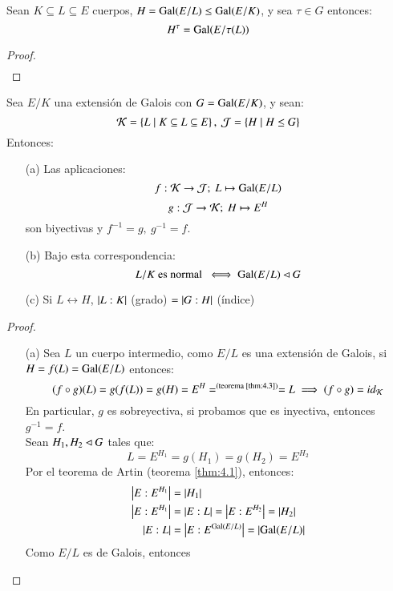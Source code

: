 \begin{lm}\label{lm:4.5} %
    Sean $K \subseteq L \subseteq E$ cuerpos, $H = \mathrm{Gal}(E/L) \leq \mathrm{Gal}(E/K)$, y sea $\tau \in G$ entonces:
    $$
        H^\tau = \mathrm{Gal}(E/\tau(L))
    $$
\end{lm}
\begin{proof}$ $
    \begin{align*}
    \end{align*}
\end{proof}


\begin{thm}\label{thm:fund-gal}\label{thm:4.6}
    Sea $E/K$ una extensión de Galois con $G = \mathrm{Gal}(E/K)$, y sean:
    $$
        \mathcal{K} = \left\{L \mid K \subseteq L \subseteq E\right\},\ \mathcal{J} = \left\{H \mid H \leq G\right\}
    $$
    Entonces:
    \begin{itemize}
        \item[(a)] Las aplicaciones:
        $$ f: \mathcal{K} \to \mathcal{J};\ L \mapsto \mathrm{Gal}(E/L)$$
        $$ g: \mtc{J} \to \mtc{K};\ H \mapsto E^H $$
        son biyectivas y $f^{-1} = g,\ g^{-1} = f$.
        \item[(b)] Bajo esta correspondencia:
        $$
            L/K \text{ es normal } \iff \mathrm{Gal}(E/L) \lhd G
        $$
        \item[(c)] Si $L \longleftrightarrow H$, $\left|L:K\right|$ (grado) $ = \left|G:H\right|$ (índice)
    \end{itemize}
\end{thm}
\begin{proof}$ $
    \begin{itemize}
        \item[(a)] Sea $L$ un cuerpo intermedio, como $E/L$ es una extensión de Galois, si $H = f(L) = \mathrm{Gal}(E/L)$ entonces:
        $$
            (f \circ g)(L) = g(f(L)) = g(H) = E^H =^{\text{(teorema \ref{thm:4.3})}} = L \implies (f \circ g) = id_{\mathcal{K}}
        $$
        En particular, $g$ es sobreyectiva, si probamos que es inyectiva, entonces $g^{-1} = f$.\\
        Sean $H_1, H_2 \lhd G$ tales que:
        $$
            L = E^{H_1} = g(H_1) = g(H_2) = E^{H_2}
        $$
        Por el teorema de Artin (teorema \ref{thm:4.1}), entonces:
        \begin{align*}
            \left|E:E^{H_1}\right| &= \left|H_1\right|\\
            \left|E:E^{H_1}\right| &= \left|E:L\right| = \left|E:E^{H_2}\right| = \left|H_2\right|\\
            \left|E:L\right| &= \left|E:E^{\mathrm{Gal}(E/L)}\right| = \left|\mathrm{Gal}(E/L)\right|
        \end{align*}
        Como $E/L$ es de Galois, entonces
    \end{itemize}
\end{proof}

